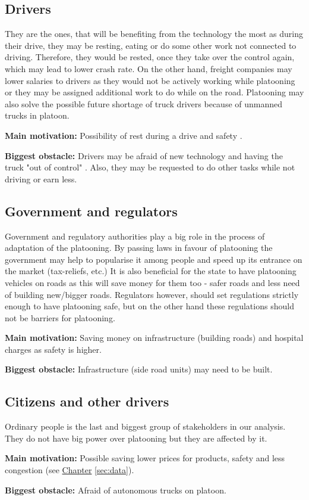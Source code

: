 \subsection{Drivers}
% 
They are the ones, that will be benefiting from the technology the most as during their drive, they may be resting, eating or do some other work not connected to driving. Therefore, they would be rested, once they take over the control again, which may lead to lower crash rate. On the other hand, freight companies may lower salaries to drivers as they would not be actively working while platooning or they may be assigned additional work to do while on the road. Platooning may also solve the possible future shortage of truck drivers \cite{OMarah2016TruckImagination} because of unmanned trucks in platoon.\par
% 
\par \textbf{Main motivation:} Possibility of rest during a drive and safety \cite[p. 37]{Chan2012ProjectSARTRE}.\par
% 
\par \textbf{Biggest obstacle:} Drivers may be afraid of new technology and having the truck "out of control" \cite{Sadeghian2016CooperativePrototype}. Also, they may be requested to do other tasks while not driving or earn less.\par
% 
\subsection{Government and regulators}
% 
Government and regulatory authorities play a big role in the process of adaptation of the platooning. By passing laws in favour of platooning the government may help to popularise it among people and speed up its entrance on the market (tax-reliefs, etc.) It is also beneficial for the state to have platooning vehicles on roads as this will save money for them too - safer roads and less need of building new/bigger roads. Regulators however, should set regulations strictly enough to have platooning safe, but on the other hand these regulations should not be barriers for platooning.
% 
\par \textbf{Main motivation:} Saving money on infrastructure (building roads) and hospital charges as safety is higher\cite[p. 37]{Chan2012ProjectSARTRE}.
% 
\par \textbf{Biggest obstacle:} Infrastructure (side road units) may need to be built.\par
% 
\subsection{Citizens and other drivers}
% 
Ordinary people is the last and biggest group of stakeholders in our analysis. They do not have big power over platooning but they are affected by it.
% 
\par \textbf{Main motivation:} Possible saving lower prices for products, safety and less congestion (see \hyperref[sec:data]{Chapter} \ref{sec:data}).\par
% 
\par \textbf{Biggest obstacle:} Afraid of autonomous trucks on platoon.\par
% 
